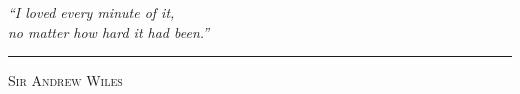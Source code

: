 \begin{minipage}{0.72\textwidth}
    \raggedright
    {\Large\itshape
    ``I loved every minute of it,\\[0.25em]
    no matter how hard it had been.''\par}
    \vspace{1.4em}
    {\raggedleft
    \textcolor{accent}{\rule{2.2em}{0.5pt}}\par
    \vspace{0.6em}
    \normalfont\small\textsc{Sir Andrew Wiles}\par}
\end{minipage}%
